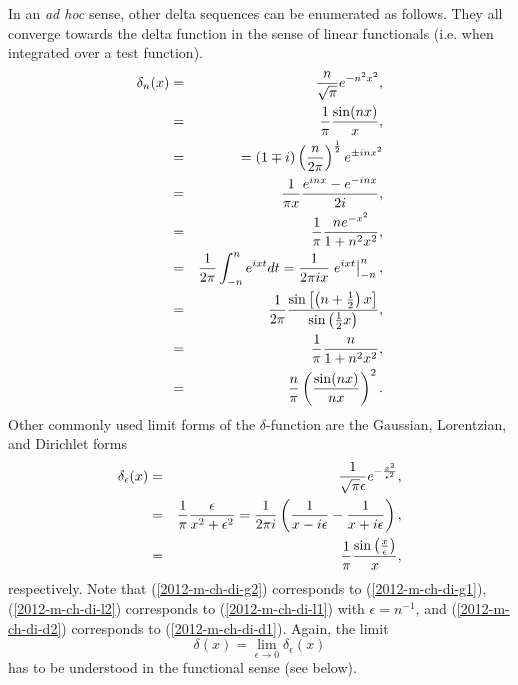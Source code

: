 In an {\it ad hoc} sense, other delta sequences can be enumerated as follows.
They all converge towards the delta function in the sense of linear functionals (i.e. when integrated over a test function).
\begin{eqnarray}
\delta_n(x)
&=& \frac{n}{\sqrt{\pi}} e^{-n^2 x^2},
\label{2012-m-ch-di-g1}\\
&=&
\frac{1}{\pi}   \frac{\sin (n x)}{ x}, \label{2012-m-ch-di-d1}\\
&=&
= (1\mp i)\left( {n\over 2\pi }\right)^{1\over 2} e^{\pm inx^2}  \\
&=&
\frac{1}{\pi x}  \frac{e^{inx}-e^{-inx}}{2i} ,\\
&=&
\frac{1}{\pi}  \frac{n  e^{-x^2}}{1+n^2x^2} ,\\
&=&
\frac{1}{2\pi } \int_{-n}^n e^{ixt} dt  = \frac{1}{2\pi i x} \left. e^{ixt}\right|_{-n}^n    ,\\
&=&
\frac{1}{2\pi} \frac{\sin \left[\left( n+\frac{1}{2}\right) x \right]  }{\sin \left( \frac{1}{2}x \right)   },\\
&=&
\frac{1}{\pi}\frac{n}{1+ n^2x^2},    \label{2012-m-ch-di-l1} \\
&=&
\frac{n}{ \pi}\left(\frac{\sin (nx)}{nx}\right)^2.
\end{eqnarray}
Other commonly used limit forms of the $\delta $-function are the Gaussian, Lorentzian, and Dirichlet forms
\begin{eqnarray}
\delta_\epsilon (x) &=&   \frac{1}{\sqrt{\pi } \epsilon } e^{-\frac{x^2}{\epsilon^2}} ,
\label{2012-m-ch-di-g2} \\
&=&  \frac{1}{\pi} \frac{\epsilon }{x^2+\epsilon^2}
=   {1\over 2\pi i}
\left(
{1 \over x-i\epsilon }
-
{1 \over x+i\epsilon }
 \right)
 , \label{2012-m-ch-di-l2}  \\
&=&  \frac{1}{\pi } \frac{\sin \left(\frac{x}{\epsilon }\right)}{x} ,  \label{2012-m-ch-di-d2}
\end{eqnarray}
respectively.
Note that
(\ref{2012-m-ch-di-g2}) corresponds to (\ref{2012-m-ch-di-g1}),
(\ref{2012-m-ch-di-l2}) corresponds to (\ref{2012-m-ch-di-l1}) with $\epsilon=n^{-1}$,
and
(\ref{2012-m-ch-di-d2}) corresponds to (\ref{2012-m-ch-di-d1}).
Again, the limit
\begin{equation}
\delta (x)= \lim_{\epsilon \rightarrow 0} \delta_\epsilon (x)
\end{equation}
has to be understood in the functional sense (see below).

